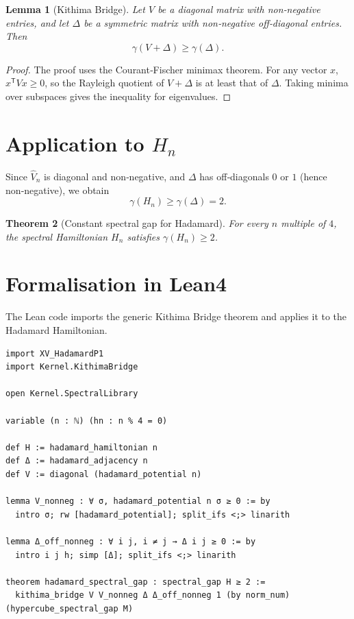 \documentclass[11pt,a4paper]{article}
\newtheorem{theorem}{Theorem}[section]
\newtheorem{lemma}[theorem]{Lemma}
\begin{document}
\begin{lemma}[Kithima Bridge]
Let $V$ be a diagonal matrix with non‑negative entries, and let $\Delta$ be a symmetric matrix with non‑negative off‑diagonal entries. Then
\[
\gamma(V + \Delta) \ge \gamma(\Delta).
\]
\end{lemma}
\begin{proof}
The proof uses the Courant‑Fischer minimax theorem. For any vector $x$, $x^{\mathsf T} V x \ge 0$, so the Rayleigh quotient of $V+\Delta$ is at least that of $\Delta$. Taking minima over subspaces gives the inequality for eigenvalues.
\end{proof}

\section{Application to $H_n$}

Since $\hat{V}_n$ is diagonal and non‑negative, and $\Delta$ has off‑diagonals $0$ or $1$ (hence non‑negative), we obtain
\[
\gamma(H_n) \ge \gamma(\Delta) = 2.
\]

\begin{theorem}[Constant spectral gap for Hadamard]
For every $n$ multiple of $4$, the spectral Hamiltonian $H_n$ satisfies $\gamma(H_n) \ge 2$.
\end{theorem}

\section{Formalisation in Lean4}

The Lean code imports the generic Kithima Bridge theorem and applies it to the Hadamard Hamiltonian.

\begin{lstlisting}[style=lean, caption={XV_HadamardP2.lean (excerpt)}]
import XV_HadamardP1
import Kernel.KithimaBridge

open Kernel.SpectralLibrary

variable (n : ℕ) (hn : n % 4 = 0)

def H := hadamard_hamiltonian n
def Δ := hadamard_adjacency n
def V := diagonal (hadamard_potential n)

lemma V_nonneg : ∀ σ, hadamard_potential n σ ≥ 0 := by
  intro σ; rw [hadamard_potential]; split_ifs <;> linarith

lemma Δ_off_nonneg : ∀ i j, i ≠ j → Δ i j ≥ 0 := by
  intro i j h; simp [Δ]; split_ifs <;> linarith

theorem hadamard_spectral_gap : spectral_gap H ≥ 2 :=
  kithima_bridge V V_nonneg Δ Δ_off_nonneg 1 (by norm_num) (hypercube_spectral_gap M)
\end{lstlisting}
\end{document}
